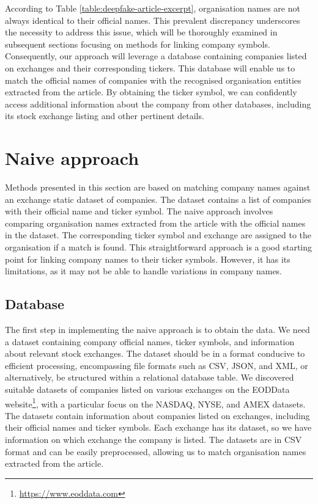 According to Table \ref{table:deepfake-article-excerpt}, organisation names are not always identical to their official names. This prevalent discrepancy underscores the necessity to address this issue, which will be thoroughly examined in subsequent sections focusing on methods for linking company symbols. Consequently, our approach will leverage a database containing companies listed on exchanges and their corresponding tickers. This database will enable us to match the official names of companies with the recognised organisation entities extracted from the article. By obtaining the ticker symbol, we can confidently access additional information about the company from other databases, including its stock exchange listing and other pertinent details.

\section{Naive approach}
\label{sec:naive-approach}
Methods presented in this section are based on matching company names against an exchange static dataset of companies. The dataset contains a list of companies with their official name and ticker symbol. The naive approach involves comparing organisation names extracted from the article with the official names in the dataset. The corresponding ticker symbol and exchange are assigned to the organisation if a match is found. This straightforward approach is a good starting point for linking company names to their ticker symbols. However, it has its limitations, as it may not be able to handle variations in company names.

\subsection{Database}
\label{subsec:data-preparation}
The first step in implementing the naive approach is to obtain the data. We need a dataset containing company official names, ticker symbols, and information about relevant stock exchanges. The dataset should be in a format conducive to efficient processing, encompassing file formats such as CSV, JSON, and XML, or alternatively, be structured within a relational database table. We discovered suitable datasets of companies listed on various exchanges on the EODData website\footnote{\href{https://www.eoddata.com}{https://www.eoddata.com}}, with a particular focus on the NASDAQ, NYSE, and AMEX datasets. The datasets contain information about companies listed on exchanges, including their official names and ticker symbols. Each exchange has its dataset, so we have information on which exchange the company is listed. The datasets are in CSV format and can be easily preprocessed, allowing us to match organisation names extracted from the article.

